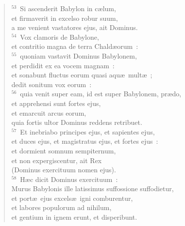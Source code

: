 \begin{flushleft}
\begin{verse}
${}^{53}$~Si ascenderit Babylon in c\ae lum,\\ et firmaverit in excelso robur suum,\\ a me venient vastatores ejus, ait Dominus.\\
${}^{54}$~Vox clamoris de Babylone,\\ et contritio magna de terra Chald\ae orum~:\\
${}^{55}$~quoniam vastavit Dominus Babylonem,\\ et perdidit ex ea vocem magnam~:\\ et sonabunt fluctus eorum quasi aqu\ae\ mult\ae~;\\ dedit sonitum vox eorum~:\\
${}^{56}$~quia venit super eam, id est super Babylonem, pr\ae do,\\ et apprehensi sunt fortes ejus,\\ et emarcuit arcus eorum,\\ quia fortis ultor Dominus reddens retribuet.\\
${}^{57}$~Et inebriabo principes ejus, et sapientes ejus,\\ et duces ejus, et magistratus ejus, et fortes ejus~:\\ et dormient somnum sempiternum,\\ et non expergiscentur, ait Rex\\ (Dominus exercituum nomen ejus).\\
${}^{58}$~H\ae c dicit Dominus exercituum~:\\ Murus Babylonis ille latissimus suffossione suffodietur,\\ et port\ae\ ejus excels\ae\ igni comburentur,\\ et labores populorum ad nihilum,\\ et gentium in ignem erunt, et disperibunt.\end{verse}\end{flushleft}


